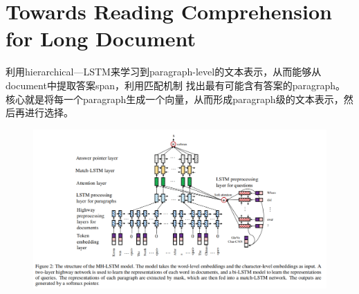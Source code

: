 \documentclass[a4paper,UTF8]{article}
\numberwithin{equation}{section}
\begin{document}
\section{Towards Reading Comprehension for Long Document}
利用hierarchical—LSTM来学习到paragraph-level的文本表示，从而能够从document中提取答案span，利用匹配机制
找出最有可能含有答案的paragraph。核心就是将每一个paragraph生成一个向量，从而形成paragraph级的文本表示，然后再进行选择。
\begin{figure}[H]
	\centering
	\includegraphics[width=\textwidth]{11-1.png}
\end{figure}
\end{document}

